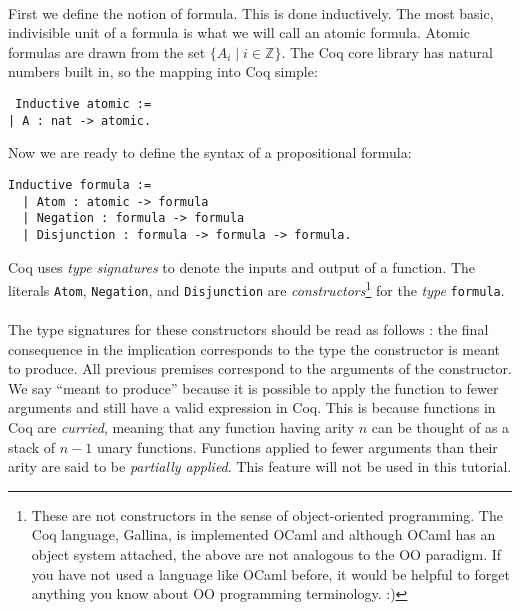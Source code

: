 \documentclass{article}
\begin{document}
\paragraph{}

First we define the notion of formula. This is done inductively. The most basic, indivisible unit of a formula is what we will call an atomic formula. Atomic formulas are drawn from the set $\lbrace A_i \; | \; i \in \mathbb{Z} \rbrace$. The Coq core library has natural numbers built in, so the mapping into Coq simple:

 \begin{lstlisting}
 Inductive atomic :=                                                                                                                                                                                         
| A : nat -> atomic.
 \end{lstlisting}

Now we are ready to define the syntax of a propositional formula:

\begin{lstlisting}
Inductive formula :=                                                                                                                                                                                        
  | Atom : atomic -> formula                                                                                                                                                                                
  | Negation : formula -> formula                                                                                                                                                                           
  | Disjunction : formula -> formula -> formula.
\end{lstlisting}

Coq uses \emph{type signatures} to denote the inputs and output of a function. The literals \verb|Atom|, \verb|Negation|, and \verb|Disjunction| are \emph{constructors}\footnote{These are not constructors in the sense of object-oriented programming. The Coq language, Gallina, is implemented OCaml and although OCaml has an object system attached, the above are not analogous to the OO paradigm. If you have not used a language like OCaml before, it would be helpful to forget anything you know about OO programming terminology. :)} for the \emph{type} \verb|formula|. 
\paragraph{}
The type signatures for these constructors should be read as follows : the final consequence in the implication corresponds to the type the constructor is meant to produce. All previous premises correspond to the arguments of the constructor. We say ``meant to produce'' because it is possible to apply the function to fewer arguments and still have a valid expression in Coq. This is because functions in Coq are \emph{curried}, meaning that any function having arity $n$ can be thought of as a stack of $n-1$ unary functions. Functions applied to fewer arguments than their arity are said to be \emph{partially applied}. This feature will not be used in this tutorial.
\end{document}
